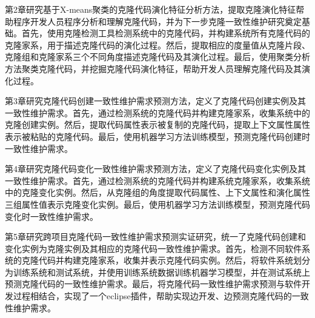 第2章研究基于X-means聚类的克隆代码演化特征分析方法，提取克隆演化特征帮助程序开发人员程序分析和理解克隆代码，并为下一步克隆一致性维护研究奠定基础。首先，使用克隆检测工具检测系统中的克隆代码，并构建系统所有克隆代码的克隆家系，用于描述克隆代码的演化过程。然后，提取相应的度量值从克隆片段、克隆组和克隆家系三个不同角度描述克隆代码及其演化过程。最后，使用聚类分析方法聚类克隆代码，并挖掘克隆代码演化特征，帮助开发人员理解克隆代码及其演化过程。

第3章研究克隆代码创建一致性维护需求预测方法，定义了克隆代码创建实例及其一致性维护需求。首先，通过检测系统的克隆代码并构建克隆家系，收集系统中的克隆创建实例。然后，提取代码属性表示被复制的克隆代码，提取上下文属性属性表示被粘贴的克隆代码。最后，使用机器学习方法训练模型，预测克隆代码创建时一致性维护需求。

第4章研究克隆代码变化一致性维护需求预测方法，定义了克隆代码变化实例及其一致性维护需求。首先，通过检测系统的克隆代码并构建系统克隆家系，收集系统中的克隆变化实例。然后，从克隆组的角度提取代码属性、上下文属性和演化属性三组属性值表示克隆变化实例。最后，使用机器学习方法训练模型，预测克隆代码变化时一致性维护需求。

第5章研究跨项目克隆代码一致性维护需求预测实证研究，统一了克隆代码创建和变化实例为克隆实例及其相应的克隆代码一致性维护需求。首先，检测不同软件系统的克隆代码并构建克隆家系，收集并表示克隆代码实例。然后，将软件系统划分为训练系统和测试系统，并使用训练系统数据训练机器学习模型，并在测试系统上预测克隆代码的一致性维护需求。最后，将克隆代码一致性维护需求预测与软件开发过程相结合，实现了一个eclipse插件，帮助实现边开发、边预测克隆代码的一致性维护需求。
